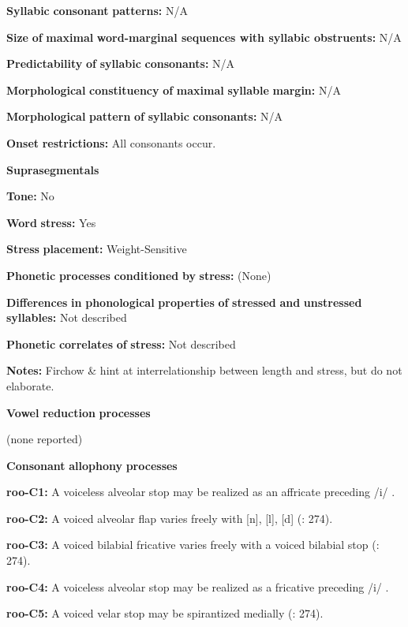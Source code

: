 \begin{styleBody}
\textbf{Syllabic} \textbf{consonant} \textbf{patterns:} N/A

\textbf{Size} \textbf{of} \textbf{maximal} \textbf{word{}-marginal sequences with syllabic obstruents:} N/A

\textbf{Predictability} \textbf{of} \textbf{syllabic} \textbf{consonants:} N/A

\textbf{Morphological} \textbf{constituency} \textbf{of} \textbf{maximal} \textbf{syllable} \textbf{margin:} N/A

\textbf{Morphological} \textbf{pattern} \textbf{of} \textbf{syllabic} \textbf{consonants:} N/A

\textbf{Onset} \textbf{restrictions:} All consonants occur.

\textbf{Suprasegmentals}

\textbf{Tone:} No

\textbf{Word} \textbf{stress:} Yes

\textbf{Stress} \textbf{placement:} Weight-Sensitive

\textbf{Phonetic} \textbf{processes} \textbf{conditioned} \textbf{by} \textbf{stress:} (None)

\textbf{Differences} \textbf{in} \textbf{phonological} \textbf{properties} \textbf{of} \textbf{stressed} \textbf{and} \textbf{unstressed} \textbf{syllables:} Not described

\textbf{Phonetic} \textbf{correlates} \textbf{of} \textbf{stress:} Not described

\textbf{Notes:} Firchow \& \citet[271]{Firchow1969} hint at interrelationship between length and stress, but do not elaborate.

\textbf{Vowel} \textbf{reduction} \textbf{processes}

(none reported)

\textbf{Consonant} \textbf{allophony} \textbf{processes}

\textbf{roo-C1:} A voiceless alveolar stop may be realized as an affricate preceding /i/ \citep[28]{Robinson2011}.

\textbf{roo-C2:} A voiced alveolar flap varies freely with [n], [l], [d] (\citealt{FirchowFirchow1969}: 274).

\textbf{roo-C3:} A voiced bilabial fricative varies freely with a voiced bilabial stop (\citealt{FirchowFirchow1969}: 274).

\textbf{roo-C4:} A voiceless alveolar stop may be realized as a fricative preceding /i/ \citep[28]{Robinson2011}.

\textbf{roo-C5:} A voiced velar stop may be spirantized medially (\citealt{FirchowFirchow1969}: 274).


\end{styleBody}
